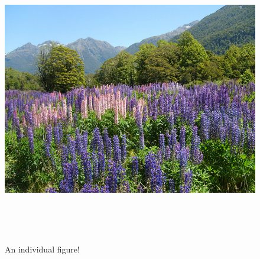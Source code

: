\begin{figure}
	\includegraphics[height =5in]{./Plots/nature.jpg}
	\caption{An individual figure!}
\end{figure}
        
